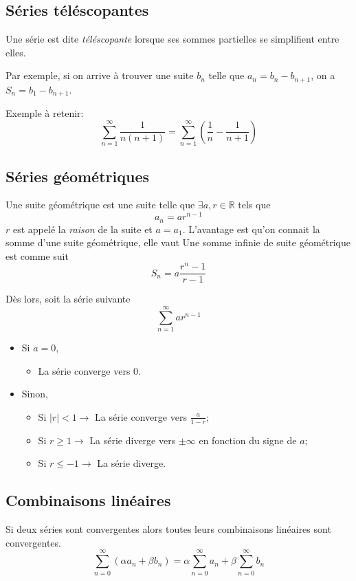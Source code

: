 \subsection{Séries téléscopantes}
Une série est dite \emph{téléscopante} lorsque
ses sommes partielles se simplifient entre elles.

Par exemple, si on arrive à trouver une suite $b_n$ telle que
$a_n = b_n - b_{n+1}$, on a
$S_n = b_1 - b_{n+1}$.

Exemple à retenir:
\[ \sum_{n = 1}^{\infty} \frac{1}{n(n + 1)} =
\sum_{n =1}^{\infty} \left(\frac{1}{n} - \frac{1}{n + 1}\right) \]

\subsection{Séries géométriques}
Une suite géométrique est une suite telle que $\exists a, r \in \mathbb{R}$
tels que
\[ a_n = ar^{n-1} \]
$r$ est appelé la \emph{raison} de la suite et $a = a_1$.
L'avantage est qu'on connait la somme d'une suite géométrique, elle vaut
Une somme infinie de suite géométrique est comme suit
\[ S_n = a \frac{r^n - 1}{r - 1} \]

Dès lors, soit la série suivante
\[ \sum_{n = 1}^{\infty} ar^{n-1} \]
\begin{itemize}
  \item Si $a = 0$,
    \begin{itemize}
      \item La série converge vers 0.
    \end{itemize}
  \item Sinon,
    \begin{itemize}
      \item Si $|r| < 1 \rightarrow$ La série converge vers $\frac{a}{1 - r}$;
      \item Si $r \geq 1 \rightarrow$ La série diverge vers $\pm \infty$
        en fonction du signe de $a$;
      \item Si $r \leq -1 \rightarrow$ La série diverge.
    \end{itemize}
\end{itemize}

\subsection{Combinaisons linéaires}
Si deux séries sont convergentes alors
toutes leurs combinaisons linéaires sont convergentes.
\[ \sum_{n=0}^{\infty} (\alpha a_n + \beta b_n)
= \alpha\sum_{n=0}^{\infty}a_n + \beta\sum_{n=0}^{\infty}b_n \]

